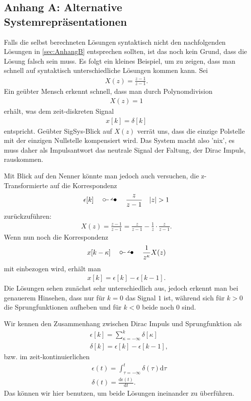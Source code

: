 \documentclass[11pt,a4paper,DIV=12]{scrartcl}
\begin{document}
\subsection{Anhang A: Alternative Systemrepräsentationen}
\label{sec:AnhangA}
Falls die selbst berechneten Lösungen syntaktisch nicht den nachfolgenden Lösungen in \ref{sec:AnhangB} entsprechen sollten, ist das noch kein Grund, dass die Lösung falsch sein muss. Es folgt ein kleines Beispiel, um zu zeigen, dass man schnell auf syntaktisch unterschiedliche Lösungen kommen kann.
Sei
\begin{align}
	X(z) = \frac{z-1}{z-1}.
\end{align}
Ein geübter Mensch erkennt schnell, dass man durch Polynomdivision
\begin{align}
	X(z)= 1
\end{align}
erhält, was dem zeit-diskreten Signal
\begin{align}
	x[k] = \delta[k]
\end{align}
entspricht.
%
Geübter SigSys-Blick auf $X(z)$ verrät uns, dass die einzige Polstelle mit der einzigen Nullstelle kompensiert wird. Das System macht also 'nix', es muss daher als Impulsantwort das neutrale Signal der Faltung, der Dirac Impuls, rauskommen.
%

Mit Blick auf den Nenner könnte man jedoch auch versuchen, die z-Transformierte auf die Korrespondenz
\begin{align}
	\epsilon[k]\quad\ztransf\quad\frac{z}{z-1}\quad |z| > 1
\end{align}
zurückzuführen:
\begin{align}
	X(z)=\frac{z-1}{z-1}=\frac{z}{z-1}-\frac{1}{z}\cdot\frac{z}{z-1}.
\end{align}
Wenn nun noch die Korrespondenz
\begin{align}
	x[k-\kappa]\quad\ztransf\quad\frac{1}{z^{\kappa}}X(z)
\end{align}
mit einbezogen wird, erhält man
\begin{align}
	x[k]=\epsilon[k]-\epsilon[k-1].
\end{align}
Die Lösungen sehen zunächst sehr unterschiedlich aus, jedoch erkennt man bei genauerem Hinsehen, dass nur für $k=0$ das Signal $1$ ist, während sich für $k>0$ die Sprungfunktionen aufheben und für $k<0$ beide noch $0$ sind.

Wir kennen den Zusammenhang zwischen Dirac Impuls und Sprungfunktion als
\begin{align}
&\epsilon[k] = \sum_{\kappa=-\infty}^{k} \delta[\kappa]\\
&\delta[k]=\epsilon[k]-\epsilon[k-1],
\end{align}
bzw. im zeit-kontinuierlichen
\begin{align}
&\epsilon(t) = \int_{\tau=-\infty}^{t} \delta(\tau) \mathrm{d}\tau\\
&\delta(t)=\frac{\mathrm{d} \epsilon(t)}{\mathrm{d} t}.
\end{align}
%
Das können wir hier benutzen, um beide Lösungen ineinander zu überführen.
\end{document}
